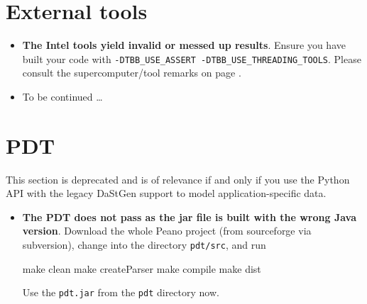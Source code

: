 


\section{External tools}
\begin{itemize}
  \item \textbf{The Intel tools yield invalid or messed up results}. Ensure 
    you have built your code with \texttt{-DTBB\_USE\_ASSERT
    -DTBB\_USE\_THREADING\_TOOLS}. Please consult the supercomputer/tool remarks
    on page \pageref{section:supercomputers:IntelTools}.
  \item To be continued \dots
\end{itemize}



\section{PDT}

This section is deprecated and is of relevance if and only if you use the Python API with 
the legacy DaStGen support to model application-specific data.


\begin{itemize}
  \item \textbf{ The PDT does not pass as the jar file is built with the wrong
  Java version}. Download the whole Peano project (from sourceforge via subversion),
  change into the directory \texttt{pdt/src}, and run
  \begin{code}
  make clean
  make createParser
  make compile
  make dist
  \end{code}
  Use the \texttt{pdt.jar} from the \texttt{pdt} directory now. 
\end{itemize}






